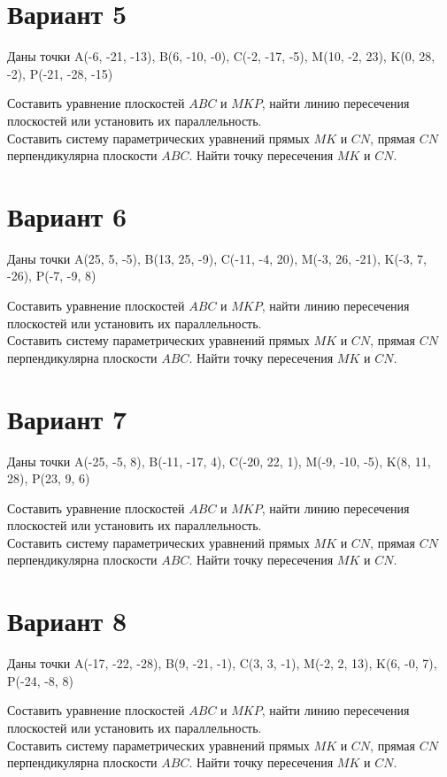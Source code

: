 \documentclass[11pt]{article}
\begin{document}
\section*{Вариант 5}
Даны точки A(-6, -21, -13), B(6, -10, -0), C(-2, -17, -5), M(10, -2, 23), K(0, 28, -2), P(-21, -28, -15)

Составить уравнение плоскостей $ABC$ и $MKP$, найти линию пересечения плоскостей или установить их параллельность.\\
Составить систему параметрических уравнений прямых $MK$ и $CN$, прямая $CN$ перпендикулярна плоскости $ABC$. Найти точку пересечения $MK$ и $CN$.

\section*{Вариант 6}
Даны точки A(25, 5, -5), B(13, 25, -9), C(-11, -4, 20), M(-3, 26, -21), K(-3, 7, -26), P(-7, -9, 8)

Составить уравнение плоскостей $ABC$ и $MKP$, найти линию пересечения плоскостей или установить их параллельность.\\
Составить систему параметрических уравнений прямых $MK$ и $CN$, прямая $CN$ перпендикулярна плоскости $ABC$. Найти точку пересечения $MK$ и $CN$.

\section*{Вариант 7}
Даны точки A(-25, -5, 8), B(-11, -17, 4), C(-20, 22, 1), M(-9, -10, -5), K(8, 11, 28), P(23, 9, 6)

Составить уравнение плоскостей $ABC$ и $MKP$, найти линию пересечения плоскостей или установить их параллельность.\\
Составить систему параметрических уравнений прямых $MK$ и $CN$, прямая $CN$ перпендикулярна плоскости $ABC$. Найти точку пересечения $MK$ и $CN$.

\section*{Вариант 8}
Даны точки A(-17, -22, -28), B(9, -21, -1), C(3, 3, -1), M(-2, 2, 13), K(6, -0, 7), P(-24, -8, 8)

Составить уравнение плоскостей $ABC$ и $MKP$, найти линию пересечения плоскостей или установить их параллельность.\\
Составить систему параметрических уравнений прямых $MK$ и $CN$, прямая $CN$ перпендикулярна плоскости $ABC$. Найти точку пересечения $MK$ и $CN$.
\end{document}
